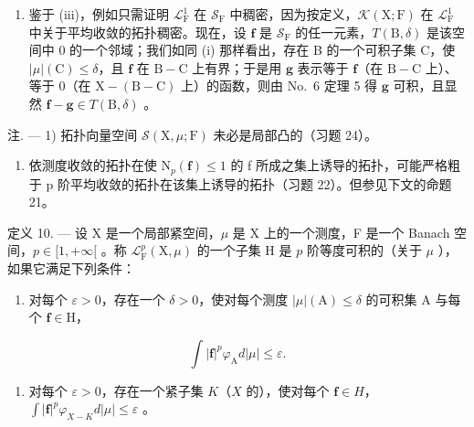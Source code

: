 \begin{enumerate}
\def\labelenumi{(\roman{enumi})}
\setcounter{enumi}{1}
\tightlist
\item
  鉴于 (iii)，例如只需证明 \(\mathcal{L}_{\mathrm{F}}^{1}\) 在 \(\mathcal{S}_{\mathrm{F}}\) 中稠密，因为按定义，\(\mathcal{K}(\mathrm{X};\mathrm{F})\) 在 \(\mathcal{L}_{\mathrm{F}}^{1}\) 中关于平均收敛的拓扑稠密。现在，设 \(\mathbf{f}\) 是 \(\mathcal{S}_{\mathrm{F}}\) 的任一元素，\(T(\mathrm{B},\delta)\) 是该空间中 0 的一个邻域；我们如同 (i) 那样看出，存在 B 的一个可积子集 C，使 \(|\mu|(\mathrm{C})\leqslant \delta\)，且 \(\mathbf{f}\) 在 \(\mathrm{B - C}\) 上有界；于是用 \(\mathbf{g}\) 表示等于 \(\mathbf{f}\)（在 \(\mathrm{B - C}\) 上）、等于 0（在 \(\mathrm{X - (B - C)}\) 上）的函数，则由 No.~6 定理 5 得 \(\mathbf{g}\) 可积，且显然 \(\mathbf{f} - \mathbf{g}\in T(\mathrm{B},\delta)\) 。
\end{enumerate}

注. --- 1) 拓扑向量空间 \(\mathcal{S}(\mathrm{X},\mu ;\mathrm{F})\) 未必是局部凸的（习题 24）。

\begin{enumerate}
\def\labelenumi{\arabic{enumi})}
\setcounter{enumi}{1}
\tightlist
\item
  依测度收敛的拓扑在使 \(\mathrm{N}_{p}(\mathbf{f}) \leqslant 1\) 的 f 所成之集上诱导的拓扑，可能严格粗于 p 阶平均收敛的拓扑在该集上诱导的拓扑（习题 22）。但参见下文的命题 21。
\end{enumerate}

定义 10. --- 设 X 是一个局部紧空间，\(\mu\) 是 X 上的一个测度，F 是一个 Banach 空间，\(p \in [1, +\infty[\) 。称 \(\mathcal{L}_{\mathrm{F}}^{p}(\mathrm{X}, \mu)\) 的一个子集 H 是 \(p\) 阶等度可积的（关于 \(\mu\) ），如果它满足下列条件：

\begin{enumerate}
\def\labelenumi{(\roman{enumi})}
\tightlist
\item
  对每个 \(\varepsilon > 0\)，存在一个 \(\delta > 0\)，使对每个测度 \(|\mu| (\mathrm{A}) \leqslant \delta\) 的可积集 A 与每个 \(\mathbf{f} \in \mathrm{H}\)，
\end{enumerate}

\[
\int | \mathbf {f} | ^ {p} \varphi_ {\mathrm{A}} d | \mu | \leqslant \varepsilon .
\]

\begin{enumerate}
\def\labelenumi{(\roman{enumi})}
\setcounter{enumi}{1}
\tightlist
\item
  对每个 \(\varepsilon > 0\)，存在一个紧子集 \(K\)（\(X\) 的），使对每个 \(\mathbf{f} \in H\)，\(\int |\mathbf{f}|^p \varphi_{X - K} d|\mu| \leqslant \varepsilon\) 。
\end{enumerate}


